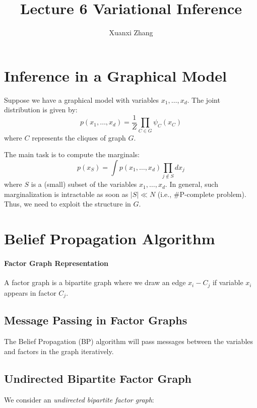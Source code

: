 \documentclass{article}%
\title{\huge Lecture 6 Variational Inference \\
\normalsize}
\author{Xuanxi Zhang}
\begin{document}
\maketitle



\section{Inference in a Graphical Model}
Suppose we have a graphical model with variables \( x_1, \dots, x_d \). The joint distribution is given by:
\[
p(x_1, \dots, x_d) = \frac{1}{Z} \prod_{C \in G} \psi_C(x_C)
\]
where \( C \) represents the cliques of graph \( G \).

The main task is to compute the marginals:
\[
p(x_S) = \int p(x_1, \dots, x_d) \prod_{j \notin S} dx_j
\]
where \( S \) is a (small) subset of the variables \( x_1, \dots, x_d \).
In general, such marginalization is intractable as soon as \( |S| \ll N \) (i.e., \#P-complete problem). \\
Thus, we need to exploit the structure in \( G \).

\section{Belief Propagation Algorithm}
\paragraph{Factor Graph Representation}
A factor graph is a bipartite graph where we draw an edge \( x_i - C_j \) if variable \( x_i \) appears in factor \( C_j \).



\subsection{Message Passing in Factor Graphs}
The Belief Propagation (BP) algorithm will pass messages between the variables and factors in the graph iteratively.



\subsection*{Undirected Bipartite Factor Graph}
We consider an \textit{undirected bipartite factor graph}:

\end{document}
